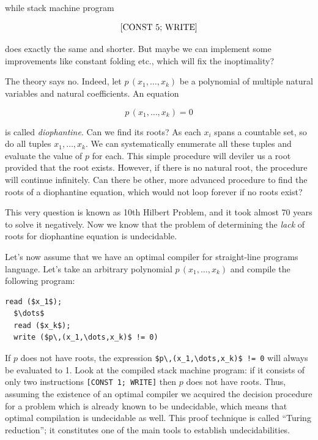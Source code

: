 while stack machine program

\[
[\llang{CONST 5; WRITE}]
\]

does exactly the same and shorter. But maybe we can implement some improvements like constant folding etc., which will fix the inoptimality?

The theory says no. Indeed, let $p\,(x_1,\dots,x_k)$ be a polynomial of multiple natural variables and natural coefficients. An equation

\[
p\,(x_1,\dots,x_k)=0
\]

is called \emph{diophantine}. Can we find its roots? As each $x_i$ spans a countable set, so do all tuples $x_1,\dots,x_k$. We can systematically
enumerate all these tuples and evaluate the value of $p$ for each. This simple procedure will deviler us a root provided that the root exists.
However, if there is no natural root, the procedure will continue infinitely. Can there be other, more advanced procedure to find the roots of
a diophantine equation, which would not loop forever if no roots exist?

This very question is known as 10th Hilbert Problem, and it took almost 70 years to solve it negatively. Now we know that the problem of
determining the \emph{lack} of roots for diophantine equation is undecidable.

Let's now assume that we have an optimal compiler for straight-line programs language. Let's take an arbitrary polynomial $p\,(x_1,\dots,x_k)$ and
compile the following program:

\begin{lstlisting}[mathescape=true]
  read ($x_1$);
  $\dots$
  read ($x_k$);
  write ($p\,(x_1,\dots,x_k)$ != 0)
\end{lstlisting}

If $p$ does not have roots, the expression \lstinline[mathescape=true]|$p\,(x_1,\dots,x_k)$ != 0| will always be evaluated to 1. Look at the
compiled stack machine program: if it consists of only two instructions \lstinline|[CONST 1; WRITE]| then $p$ does not have roots. Thus,
assuming the existence of an optimal compiler we acquired the decision procedure for a problem which is already known to be undecidable, which
means that optimal compilation is undecidable as well. This proof technique is called ``Turing reduction''; it constitutes one of the main tools
to establish undecidabilities.
